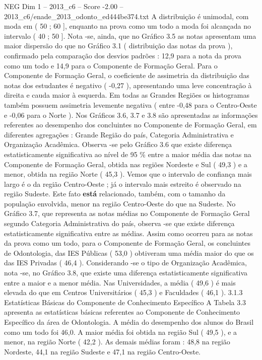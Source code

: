 \begin{textsample}{NEG Dim 1 – 2013\_c6 – Score -2.00 – 2013\_c6/enade\_2013\_odonto\_ed444be374.txt}
A distribuição é unimodal, com moda em ( 50 ; 60 ], enquanto na prova como um todo a moda foi alcançada no intervalo ( 40 ; 50 ].
Nota -se, ainda, que no Gráfico 3.5 as notas apresentam uma maior dispersão do que no Gráfico 3.1 ( distribuição das notas da prova ), confirmado pela comparação dos desvios padrões : 12,9 para a nota da prova como um todo e 14,9 para o Componente de Formação Geral.
Para o Componente de Formação Geral, o coeficiente de assimetria da distribuição das notas dos estudantes é negativo ( -0,27 ), apresentando uma leve concentração à direita e cauda maior à esquerda.
Em todas as Grandes Regiões os histogramas também possuem assimetria levemente negativa ( entre -0,48 para o Centro-Oeste e -0,06 para o Norte ).
Nos Gráficos 3.6, 3.7 e 3.8 são apresentadas as informações referentes ao desempenho dos concluintes no Componente de Formação Geral, em diferentes agregações : Grande Região do país, Categoria Administrativa e Organização Acadêmica.
Observa -se pelo Gráfico 3.6 que existe diferença estatisticamente significativa ao nível de 95 \% entre a maior média das notas na Componente de Formação Geral, obtida nas regiões Nordeste e Sul ( 49,3 ) e a menor, obtida na região Norte ( 45,3 ).
Vemos que o intervalo de confiança mais largo é o da região Centro-Oeste ; já o intervalo mais estreito é observado na região Sudeste.
Este fato \textbf{está} relacionado, também, com o tamanho da população envolvida, menor na região Centro-Oeste do que na Sudeste.
No Gráfico 3.7, que representa as notas médias no Componente de Formação Geral segundo Categoria Administrativa do país, observa -se que existe diferença estatisticamente significativa entre as médias.
Assim como ocorreu para as notas da prova como um todo, para o Componente de Formação Geral, os concluintes de Odontologia, das IES Públicas ( 53,0 ) obtiveram uma média maior do que os das IES Privadas ( 46,4 ).
Considerando -se o tipo de Organização Acadêmica, nota -se, no Gráfico 3.8, que existe uma diferença estatisticamente significativa entre a maior e a menor média.
Nas Universidades, a média ( 49,6 ) é mais elevada do que em Centros Universitários ( 45,3 ) e Faculdades ( 46,1 ). 3.1.3 Estatísticas Básicas do Componente de Conhecimento Específico A Tabela 3.3 apresenta as estatísticas básicas referentes ao Componente de Conhecimento Específico da área de Odontologia.
A média do desempenho dos alunos do Brasil como um todo foi 46,0.
A maior média foi obtida na região Sul ( 49,5 ), e a menor, na região Norte ( 42,2 ).
As demais médias foram : 48,8 na região Nordeste, 44,1 na região Sudeste e 47,1 na região Centro-Oeste.

\end{textsample}
